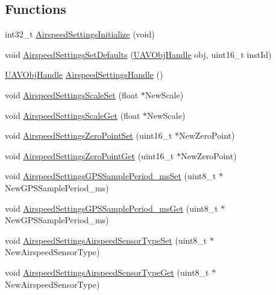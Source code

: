 \subsection*{\-Functions}
\begin{DoxyCompactItemize}
\item 
int32\-\_\-t \hyperlink{group___airspeed_settings_gab12fcea99cc8868f5eadd16d3788f84d}{\-Airspeed\-Settings\-Initialize} (void)
\item 
void \hyperlink{group___airspeed_settings_ga96890f2fb19ecdbf379701bd024fd963}{\-Airspeed\-Settings\-Set\-Defaults} (\hyperlink{targets_2_u_a_v_objects_2inc_2uavobjectmanager_8h_a279053e22be53ce9f895043aaeb91e3b}{\-U\-A\-V\-Obj\-Handle} obj, uint16\-\_\-t inst\-Id)
\item 
\hyperlink{targets_2_u_a_v_objects_2inc_2uavobjectmanager_8h_a279053e22be53ce9f895043aaeb91e3b}{\-U\-A\-V\-Obj\-Handle} \hyperlink{group___airspeed_settings_ga68df8c3f46389f67c1258179a73c0dd0}{\-Airspeed\-Settings\-Handle} ()
\item 
void \hyperlink{group___airspeed_settings_ga5bdb544d14bbde8aba0245cb868b3097}{\-Airspeed\-Settings\-Scale\-Set} (float $\ast$\-New\-Scale)
\item 
void \hyperlink{group___airspeed_settings_gabf75e1da8c355b4c05cf904281c6daac}{\-Airspeed\-Settings\-Scale\-Get} (float $\ast$\-New\-Scale)
\item 
void \hyperlink{group___airspeed_settings_gac6a9b280a182339121fb567441f7b34e}{\-Airspeed\-Settings\-Zero\-Point\-Set} (uint16\-\_\-t $\ast$\-New\-Zero\-Point)
\item 
void \hyperlink{group___airspeed_settings_ga60fb99f98378eeb80ee06d614b6b65f6}{\-Airspeed\-Settings\-Zero\-Point\-Get} (uint16\-\_\-t $\ast$\-New\-Zero\-Point)
\item 
void \hyperlink{group___airspeed_settings_gacb794d90d5749e93e2d386ab4aea0802}{\-Airspeed\-Settings\-G\-P\-S\-Sample\-Period\-\_\-ms\-Set} (uint8\-\_\-t $\ast$\-New\-G\-P\-S\-Sample\-Period\-\_\-ms)
\item 
void \hyperlink{group___airspeed_settings_gadf8865bc84ab9f693f1435a392cca7ee}{\-Airspeed\-Settings\-G\-P\-S\-Sample\-Period\-\_\-ms\-Get} (uint8\-\_\-t $\ast$\-New\-G\-P\-S\-Sample\-Period\-\_\-ms)
\item 
void \hyperlink{group___airspeed_settings_ga1f9ff7e077ed1b6638d089f6371660a7}{\-Airspeed\-Settings\-Airspeed\-Sensor\-Type\-Set} (uint8\-\_\-t $\ast$\-New\-Airspeed\-Sensor\-Type)
\item 
void \hyperlink{group___airspeed_settings_ga698e82dd8f86f8c0cbb1e562e3c72b09}{\-Airspeed\-Settings\-Airspeed\-Sensor\-Type\-Get} (uint8\-\_\-t $\ast$\-New\-Airspeed\-Sensor\-Type)
\end{DoxyCompactItemize}



